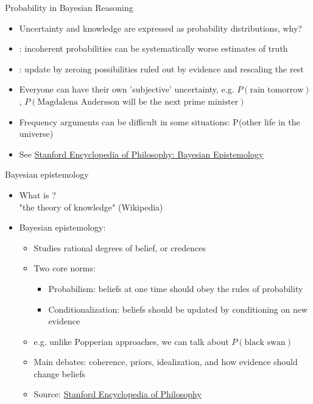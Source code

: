\documentclass[10pt]{beamer}
\begin{document}
\begin{frame}{Probability in Bayesian Reasoning}

  \begin{itemize}
  \item Uncertainty and knowledge are expressed as probability distributions, why? \pause
  \item {}: incoherent probabilities can be systematically worse estimates of truth
  \item {}: update by zeroing possibilities ruled out by evidence and rescaling the rest
  \pause
  \item Everyone can have their own 'subjective' uncertainty, e.g.  $P(\text{rain tomorrow})$, $P(\text{Magdalena Andersson will be the next prime minister})$ \pause
  \item Frequency arguments can be difficult in some situations: P(other life in the universe)
  \item {\footnotesize See \href{https://plato.stanford.edu/entries/epistemology-bayesian/}{Stanford Encyclopedia of Philosophy: Bayesian Epistemology}}
  \end{itemize}
\end{frame}


\begin{frame}{Bayesian epistemology}




  \begin{itemize}
    \item What is ?
    \pause
    \\ "the theory of knowledge" (Wikipedia)
    \pause
    \item Bayesian epistemology:
    \pause
    \begin{itemize}
    \item Studies rational degrees of belief, or credences\pause
    \item Two core norms:
      \begin{itemize}
      \item Probabilism: beliefs at one time should obey the rules of probability\pause
      \item Conditionalization: beliefs should be updated by conditioning on new evidence\pause
      \end{itemize}
    \item e.g. unlike Popperian approaches, we can talk about $P(\text{black swan})$\pause
    \item Main debates: coherence, priors, idealization, and how evidence should change beliefs
    \item {\footnotesize Source: \href{https://plato.stanford.edu/entries/epistemology-bayesian/}{Stanford Encyclopedia of Philosophy}}
    \end{itemize}
  \end{itemize}
\end{frame}
\end{document}
